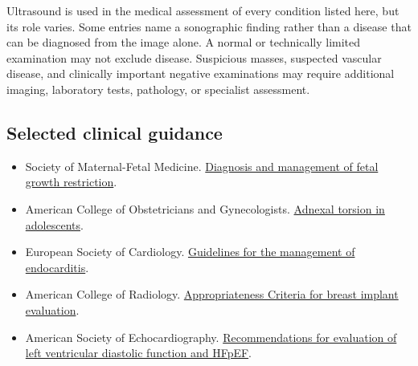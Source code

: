 Ultrasound is used in the medical assessment of every condition listed here, but its role varies. Some entries name a sonographic finding rather than a disease that can be diagnosed from the image alone. A normal or technically limited examination may not exclude disease. Suspicious masses, suspected vascular disease, and clinically important negative examinations may require additional imaging, laboratory tests, pathology, or specialist assessment.

\subsection{Selected clinical guidance}
\begin{itemize}
    \item Society of Maternal-Fetal Medicine. \href{https://publications.smfm.org/publications/289-society-for-maternal-fetal-medicine-consult-series-52/}{Diagnosis and management of fetal growth restriction}.
    \item American College of Obstetricians and Gynecologists. \href{https://www.acog.org/clinical/clinical-guidance/committee-opinion/articles/2019/08/adnexal-torsion-in-adolescents}{Adnexal torsion in adolescents}.
    \item European Society of Cardiology. \href{https://academic.oup.com/eurheartj/article/44/39/3948/7243107}{Guidelines for the management of endocarditis}.
    \item American College of Radiology. \href{https://acsearch.acr.org/docs/3100728/Narrative/}{Appropriateness Criteria for breast implant evaluation}.
    \item American Society of Echocardiography. \href{https://www.asecho.org/wp-content/uploads/2025/07/Left-Ventricular-Diastolic-Function.pdf}{Recommendations for evaluation of left ventricular diastolic function and HFpEF}.
\end{itemize}
